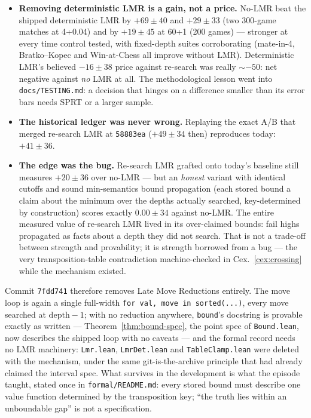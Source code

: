 \documentclass[11pt]{article}
\theoremstyle{plain}
\theoremstyle{definition}
\theoremstyle{remark}
\begin{document}
\begin{itemize}
  \item \textbf{Removing deterministic LMR is a gain, not a price.}
    No-LMR beat the shipped deterministic LMR by $+69 \pm 40$ and
    $+29 \pm 33$ (two 300-game matches at 4+0.04) and by $+19 \pm 45$
    at 60+1 (200 games) --- stronger at every time control tested,
    with fixed-depth suites corroborating (mate-in-4, Bratko--Kopec
    and Win-at-Chess all improve without LMR).  Deterministic LMR's
    believed $-16 \pm 38$ price against re-search was really
    ${\sim}{-50}$: net negative against \emph{no} LMR at all.  The
    methodological lesson went into \texttt{docs/TESTING.md}: a
    decision that hinges on a difference smaller than its error bars
    needs SPRT or a larger sample.
  \item \textbf{The historical ledger was never wrong.}  Replaying the
    exact A/B that merged re-search LMR at \texttt{58883ea} ($+49 \pm
    34$ then) reproduces today: $+41 \pm 36$.
  \item \textbf{The edge was the bug.}  Re-search LMR grafted onto
    today's baseline still measures $+20 \pm 36$ over no-LMR --- but
    an \emph{honest} variant with identical cutoffs and sound
    min-semantics bound propagation (each stored bound a claim about
    the minimum over the depths actually searched, key-determined by
    construction) scores exactly $0.00 \pm 34$ against no-LMR.  The
    entire measured value of re-search LMR lived in its over-claimed
    bounds: fail highs propagated as facts about a depth they did not
    search.  That is not a trade-off between strength and provability;
    it is strength borrowed from a bug --- the very transposition-table
    contradiction machine-checked in Cex.~\ref{cex:crossing} while the
    mechanism existed.
\end{itemize}

Commit \texttt{7fdd741} therefore removes Late Move Reductions
entirely.  The move loop is again a single full-width \texttt{for val,
move in sorted(...)}, every move searched at $\mathrm{depth} - 1$; with
no reduction anywhere, \texttt{bound}'s docstring is provable exactly
as written --- Theorem~\ref{thm:bound-spec}, the point spec of
\texttt{Bound.lean}, now describes the shipped loop with no caveats
--- and the formal record needs no LMR machinery: \texttt{Lmr.lean},
\texttt{LmrDet.lean} and \texttt{TableClamp.lean} were deleted with
the mechanism, under the same git-is-the-archive principle that had
already claimed the interval spec.  What survives in the development
is what the episode taught, stated once in \texttt{formal/README.md}:
every stored bound must describe one value function determined by the
transposition key; ``the truth lies within an unboundable gap'' is not
a specification.
\end{document}
